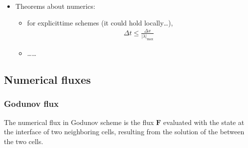 \documentclass[letterpaper,10pt,english]{jupyterBook}
\begin{document}
\begin{itemize}
\begin{itemize}
\begin{itemize}
\begin{itemize}
\item {} 
\sphinxAtStartPar
low order method where the solution has discontinuities

\item {} 
\sphinxAtStartPar
high\sphinxhyphen{}resolution achieved as a linear combination of a low and high order flux
\begin{equation*}
\begin{split}F(u_{i+1/2}) = f^{low}_{i+1/2} + \phi(r_{i-1,i}) \left( f^{high}_{i+1/2} - f^{low}_{i+1/2} \right) \ ,\end{split}
\end{equation*}
\sphinxAtStartPar
being \(\phi(r_{i,i+1})\) the flux limiter, i.e. a function of the gradient \(r_i\) of the solution on the grid

\end{itemize}

\end{itemize}

\end{itemize}

\item {} 
\sphinxAtStartPar
Theorems about numerics:
\begin{itemize}
\item {} 
\sphinxAtStartPar
{} for explicit\sphinxhyphen{}time schemes (it could hold locally…),
\begin{equation*}
\begin{split}\Delta t \le \frac{\Delta x}{|\lambda|_{\max}}\end{split}
\end{equation*}
\item {} 
\sphinxAtStartPar
……

\end{itemize}

\end{itemize}


\subsection{Numerical fluxes}
\label{\detokenize{ch/pde/fvm-hyperbolic-pde:numerical-fluxes}}\label{\detokenize{ch/pde/fvm-hyperbolic-pde:pde-fvm-hyperbolic-flux}}

\subsubsection{Godunov flux}
\label{\detokenize{ch/pde/fvm-hyperbolic-pde:godunov-flux}}\label{\detokenize{ch/pde/fvm-hyperbolic-pde:pde-fvm-hyperbolic-flux-godunov}}
\sphinxAtStartPar
The numerical flux in Godunov scheme is the flux \(\mathbf{F}\) evaluated with the state at the interface of two neighboring cells, resulting from  the solution of the {\hyperref[\detokenize{ch/pde/hyperbolic-riemann-pb:pde-hyperbolic-riemann-pb}]{}} between the two cells.
\end{document}
